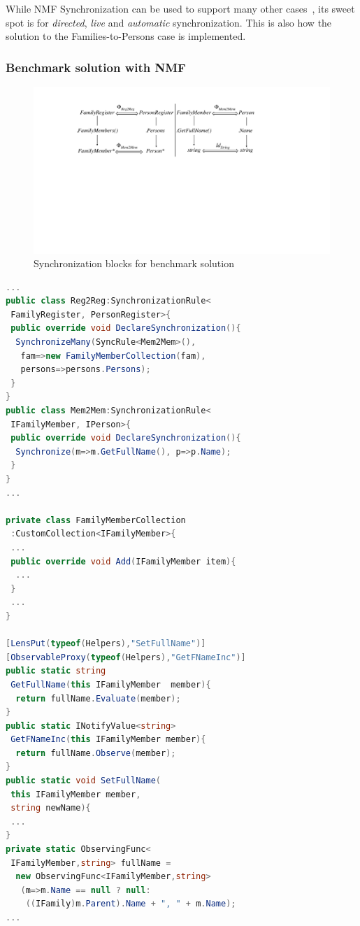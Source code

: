 While NMF Synchronization can be used to support many other cases~\cite{SoSyM2017-Hinkel}, its sweet spot is for \emph{directed}, \emph{live} and \emph{automatic} synchronization.
This is also how the solution to the Families-to-Persons case is implemented. 

\subsubsection{Benchmark solution with NMF}
\label{sec:solutionNMF}

\begin{figure}[b!]
  \centering
  \includegraphics[width=\columnwidth]{diagrams/solutions/NMFSynchronizationBlockBenchmark}
  \caption{Synchronization blocks for benchmark solution}
  \label{fig:NMFSynchronizationBlockBenchmark}
\end{figure}


\begin{lstlisting}[label={lst:nmf}, float=b!, language=cs, caption={Solution in NMF Synchronizations}]
...
public class Reg2Reg:SynchronizationRule<
 FamilyRegister, PersonRegister>{
 public override void DeclareSynchronization(){
  SynchronizeMany(SyncRule<Mem2Mem>(),
   fam=>new FamilyMemberCollection(fam),
   persons=>persons.Persons);
 }
}
public class Mem2Mem:SynchronizationRule<
 IFamilyMember, IPerson>{
 public override void DeclareSynchronization(){
  Synchronize(m=>m.GetFullName(), p=>p.Name);
 }
}
...

private class FamilyMemberCollection 
 :CustomCollection<IFamilyMember>{
 ...
 public override void Add(IFamilyMember item){
  ...
 }
 ...
}

[LensPut(typeof(Helpers),"SetFullName")]
[ObservableProxy(typeof(Helpers),"GetFNameInc")]
public static string
 GetFullName(this IFamilyMember  member){
  return fullName.Evaluate(member);
}
public static INotifyValue<string>
 GetFNameInc(this IFamilyMember member){
  return fullName.Observe(member);
}
public static void SetFullName(
 this IFamilyMember member,
 string newName){
 ...
}
private static ObservingFunc<
 IFamilyMember,string> fullName =
  new ObservingFunc<IFamilyMember,string>
   (m=>m.Name == null ? null:
    ((IFamily)m.Parent).Name + ", " + m.Name);
...
\end{lstlisting} 

